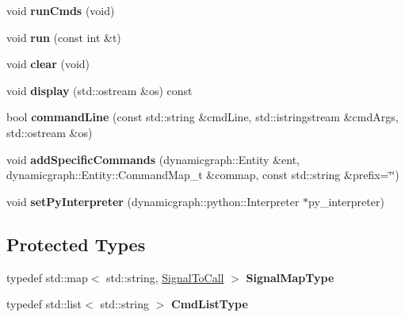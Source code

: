 \begin{DoxyCompactItemize}
void {\bfseries run\+Cmds} (void)
\item 
\mbox{\label{classdynamic__graph_1_1PeriodicCall_a03b883cf9713378452c51601c0137285}} 
void {\bfseries run} (const int \&t)
\item 
\mbox{\label{classdynamic__graph_1_1PeriodicCall_a008800cf257d3cf9f16d56d47a2a08a7}} 
void {\bfseries clear} (void)
\item 
\mbox{\label{classdynamic__graph_1_1PeriodicCall_a898d1809ddd0a820ee4e278a4b8fe47e}} 
void {\bfseries display} (std\+::ostream \&os) const
\item 
\mbox{\label{classdynamic__graph_1_1PeriodicCall_a042c2a1139e779cd308c9d95b51a8485}} 
bool {\bfseries command\+Line} (const std\+::string \&cmd\+Line, std\+::istringstream \&cmd\+Args, std\+::ostream \&os)
\item 
\mbox{\label{classdynamic__graph_1_1PeriodicCall_a51669d6bc8fa3fd4ccc386f2b9649d57}} 
void {\bfseries add\+Specific\+Commands} (dynamicgraph\+::\+Entity \&ent, dynamicgraph\+::\+Entity\+::\+Command\+Map\+\_\+t \&commap, const std\+::string \&prefix=\char`\"{}\char`\"{})
\item 
\mbox{\label{classdynamic__graph_1_1PeriodicCall_a6b6534066019b42f1cf671bb0cb24ec5}} 
void {\bfseries set\+Py\+Interpreter} (dynamicgraph\+::python\+::\+Interpreter $\ast$py\+\_\+interpreter)
\end{DoxyCompactItemize}
\subsection*{Protected Types}
\begin{DoxyCompactItemize}
\item 
\mbox{\label{classdynamic__graph_1_1PeriodicCall_acf4cd14a78523d6612d4679cb5a67d8b}} 
typedef std\+::map$<$ std\+::string, \hyperlink{structdynamic__graph_1_1PeriodicCall_1_1SignalToCall}{Signal\+To\+Call} $>$ {\bfseries Signal\+Map\+Type}
\item 
\mbox{\label{classdynamic__graph_1_1PeriodicCall_a9f1b6479e369706876d3f9a145b4f621}} 
typedef std\+::list$<$ std\+::string $>$ {\bfseries Cmd\+List\+Type}
\end{DoxyCompactItemize}
